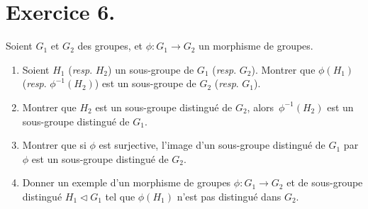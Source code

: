 \documentclass[./main]{subfiles}
\begin{document}
  \section{Exercice 6.} \label{td1-ex6}
  \begin{enonce}
    Soient $G_1$ et $G_2$ des groupes, et $\phi : G_1 \to G_2$ un morphisme de groupes.
    \begin{enumerate}
      \item Soient $H_1$ (\textit{resp}. $H_2$) un sous-groupe de $G_1$ (\textit{resp}. $G_2$). Montrer que $\phi(H_1)$ (\textit{resp}. $\phi^{-1}(H_2)$) est un sous-groupe de $G_2$ (\textit{resp}. $G_1$).
      \item Montrer que $H_2$ est un sous-groupe distingué de $G_2$, alors~$\phi^{-1}(H_2)$ est un sous-groupe distingué de $G_1$.
      \item Montrer que si $\phi$ est surjective, l'image d'un sous-groupe distingué de $G_1$ par $\phi$ est un sous-groupe distingué de $G_2$.
      \item Donner un exemple d'un morphisme de groupes $\phi : G_1 \to G_2$ et de sous-groupe distingué $H_1 \triangleleft G_1$ tel que $\phi(H_1)$ n'est pas distingué dans $G_2$.
    \end{enumerate}
  \end{enonce}
\end{document}
